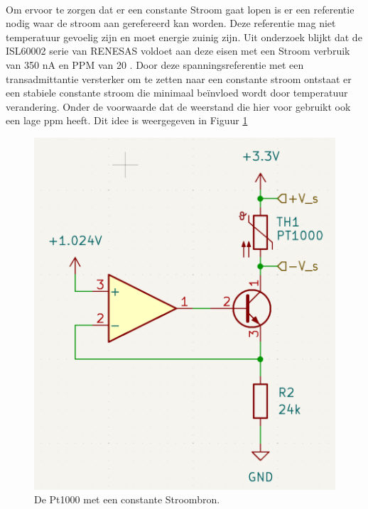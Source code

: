 \\
\newline
Om ervoor te zorgen dat er een constante Stroom gaat lopen is er een referentie nodig waar de stroom aan gerefereerd kan worden. Deze referentie mag niet temperatuur gevoelig zijn en moet energie zuinig zijn. Uit onderzoek blijkt dat de ISL60002 serie van RENESAS voldoet aan deze eisen met een Stroom verbruik van 350 nA en PPM van 20 \cite{Spannings_ref}. Door deze spanningsreferentie met een transadmittantie versterker om te zetten naar een constante stroom ontstaat er een stabiele constante stroom die minimaal beïnvloed wordt door temperatuur verandering. Onder de voorwaarde dat de weerstand die hier voor gebruikt ook een lage ppm heeft. Dit idee is weergegeven in Figuur \ref{fig:transadmittantie_versterker}

\begin{figure}[H]
    \centering
    \includegraphics[width=0.5\linewidth]{pictures/Schema_current_source.png}
    \caption{De Pt1000 met een constante Stroombron.}
    \label{fig:transadmittantie_versterker}
\end{figure}

